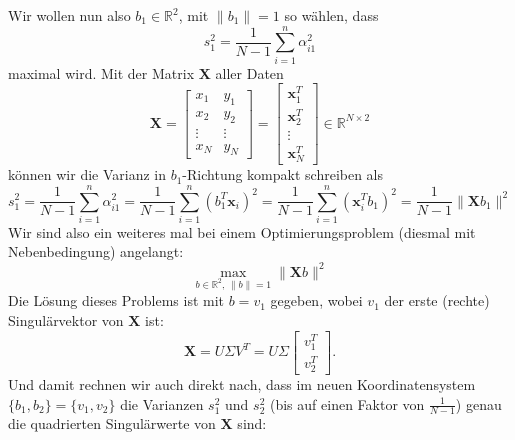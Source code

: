 \documentclass[]{book}
\theoremstyle{definition}
\theoremstyle{definition}
\theoremstyle{definition}
\theoremstyle{definition}
\theoremstyle{remark}
\begin{document}
Wir wollen nun also \(b_1\in \mathbb R^{2}\), mit \(\|b_1\|=1\) so wählen, dass
\begin{equation*}
s_1^2 = \frac{1}{N-1}\sum_{i=1}^n \alpha_{i1}^2
\end{equation*}
maximal wird. Mit der Matrix \(\mathbf X\) aller Daten
\begin{equation*}
\mathbf X = \begin{bmatrix}
x_1 & y_1 \\ x_2 & y_2 \\ \vdots & \vdots \\ x_N & y_N
\end{bmatrix} = 
\begin{bmatrix}
\mathbf x_1^T\\ \mathbf x_2^T  \\  \vdots \\ \mathbf x_N^T
\end{bmatrix} 
\in \mathbb R^{N\times 2}
\end{equation*}
können wir die Varianz in \(b_1\)-Richtung kompakt schreiben als
\begin{equation*}
s_1^2 = \frac{1}{N-1}\sum_{i=1}^n \alpha_{i1}^2
= \frac{1}{N-1}\sum_{i=1}^n (b_1^T\mathbf x_i)^2
= \frac{1}{N-1}\sum_{i=1}^n (\mathbf x_i^Tb_1)^2
= \frac{1}{N-1}\| \mathbf X b_1 \|^2
\end{equation*}
Wir sind also ein weiteres mal bei einem Optimierungsproblem (diesmal mit Nebenbedingung) angelangt:
\begin{equation*}
\max_{b\in \mathbb R^{2},\, \|b\|=1} \|\mathbf X b\|^2
\end{equation*}
Die Lösung dieses Problems ist mit \(b=v_1\) gegeben, wobei \(v_1\) der erste (rechte) Singulärvektor von \(\mathbf X\) ist:
\begin{equation*}
\mathbf X = U \Sigma V^T = U \Sigma \begin{bmatrix}
v_1^T \\ v_2^T
\end{bmatrix}.
\end{equation*}
Und damit rechnen wir auch direkt nach, dass im neuen Koordinatensystem \(\{b_1, b_2\}=\{v_1, v_2\}\) die Varianzen \(s_1^2\) und \(s_2^2\) (bis auf einen Faktor von \(\frac{1}{N-1}\)) genau die quadrierten Singulärwerte von \(\mathbf X\) sind:
\end{document}
